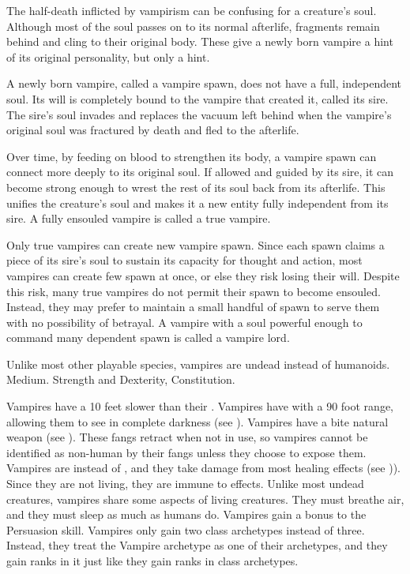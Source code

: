   The half-death inflicted by vampirism can be confusing for a creature's soul.
  Although most of the soul passes on to its normal afterlife, fragments remain behind and cling to their original body.
  These give a newly born vampire a hint of its original personality, but only a hint.

  A newly born vampire, called a vampire spawn, does not have a full, independent soul.
  Its will is completely bound to the vampire that created it, called its sire.
  The sire's soul invades and replaces the vacuum left behind when the vampire's original soul was fractured by death and fled to the afterlife.

  Over time, by feeding on blood to strengthen its body, a vampire spawn can connect more deeply to its original soul.
  If allowed and guided by its sire, it can become strong enough to wrest the rest of its soul back from its afterlife.
  This unifies the creature's soul and makes it a new entity fully independent from its sire.
  A fully ensouled vampire is called a true vampire.

  Only true vampires can create new vampire spawn.
  Since each spawn claims a piece of its sire's soul to sustain its capacity for thought and action, most vampires can create few spawn at once, or else they risk losing their will.
  Despite this risk, many true vampires do not permit their spawn to become ensouled.
  Instead, they may prefer to maintain a small handful of spawn to serve them with no possibility of betrayal.
  A vampire with a soul powerful enough to command many dependent spawn is called a vampire lord.

   Unlike most other playable species, vampires are undead instead of humanoids.
   Medium.
    Strength and Dexterity,  Constitution.
  \begin{raggeditemize}
     Vampires have a  10 feet slower than their .
     Vampires have  with a 90 foot range, allowing them to see in complete darkness (see ).
     Vampires have a bite natural weapon (see ).
      These fangs retract when not in use, so vampires cannot be identified as non-human by their fangs unless they choose to expose them.
     Vampires are  instead of , and they take damage from most healing effects (see )).
      Since they are not living, they are immune to \atPoison effects.
     Unlike most undead creatures, vampires share some aspects of living creatures.
      They must breathe air, and they must sleep as much as humans do.
     Vampires gain a  bonus to the Persuasion skill.
     Vampires only gain two class archetypes instead of three.
      Instead, they treat the Vampire archetype as one of their archetypes, and they gain ranks in it just like they gain ranks in class archetypes.
  \end{raggeditemize}

